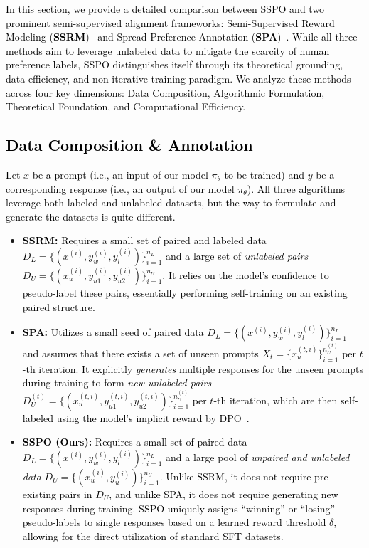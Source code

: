 \documentclass{article} %
\newcommand\rebuttal[1]{\textcolor{black}{#1}}
\begin{document}
\rebuttal{In this section, we provide a detailed comparison between SSPO and two prominent semi-supervised alignment frameworks: Semi-Supervised Reward Modeling (\textbf{SSRM})~\citep{he-etal-2024-semi-supervised} and Spread Preference Annotation (\textbf{SPA})~\citep{kim2025spreadpreferenceannotationdirect}. While all three methods aim to leverage unlabeled data to mitigate the scarcity of human preference labels, SSPO distinguishes itself through its theoretical grounding, data efficiency, and non-iterative training paradigm. We analyze these methods across four key dimensions: Data Composition, Algorithmic Formulation, Theoretical Foundation, and Computational Efficiency.}

\subsection{\rebuttal{Data Composition \& Annotation}}

\rebuttal{Let $x$ be a prompt (i.e., an input of our model $\pi_\theta$ to be trained) and $y$ be a corresponding response (i.e., an output of our model $\pi_\theta$). All three algorithms leverage both labeled and unlabeled datasets, but the way to formulate and generate the datasets is quite different.}

\begin{itemize}
    \item \rebuttal{\textbf{SSRM:} Requires a small set of paired and labeled data $D_L = \{(x^{(i)}, y_w^{(i)}, y_l^{(i)})\}_{i=1}^{n_L}$ and a large set of \textit{unlabeled pairs} $D_U = \{(x_u^{(i)}, y_{u1}^{(i)}, y_{u2}^{(i)})\}_{i=1}^{n_U}$. It relies on the model's confidence to pseudo-label these pairs, essentially performing self-training on an existing paired structure.}
    \item \rebuttal{\textbf{SPA:} Utilizes a small seed of paired data $D_L = \{(x^{(i)}, y_w^{(i)}, y_l^{(i)})\}_{i=1}^{n_L}$ and assumes that there exists a set of unseen prompts $X_t = \{x_u^{(t,i)}\}_{i=1}^{n_U^{(t)}}$ per $t$-th iteration. It explicitly \textit{generates} multiple responses for the unseen prompts during training to form \textit{new unlabeled pairs} $D_U^{(t)} = \{(x_u^{(t,i)}, y_{u1}^{(t,i)}, y_{u2}^{(t,i)})\}_{i=1}^{n_U^{(t)}}$ per $t$-th iteration, which are then self-labeled using the model's implicit reward by DPO~\citep{rafailov2024direct}.}
    \item \rebuttal{\textbf{SSPO (Ours):} Requires a small set of paired data $D_L = \{(x^{(i)}, y_w^{(i)}, y_l^{(i)})\}_{i=1}^{n_L}$ and a large pool of \textit{unpaired and unlabeled data} $D_U = \{(x_u^{(i)}, y_{u}^{(i)})\}_{i=1}^{n_U}$. Unlike SSRM, it does not require pre-existing pairs in $D_U$, and unlike SPA, it does not require generating new responses during training. SSPO uniquely assigns ``winning'' or ``losing'' pseudo-labels to single responses based on a learned reward threshold $\delta$, allowing for the direct utilization of standard SFT datasets.}
\end{itemize}
\end{document}
